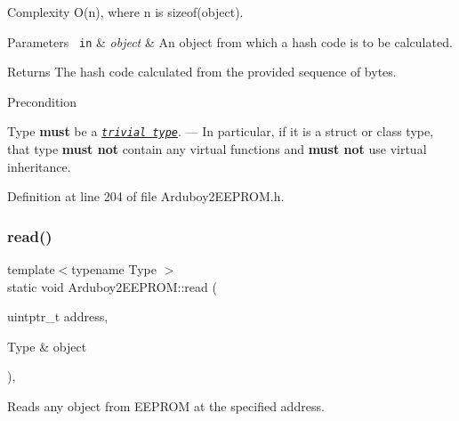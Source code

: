 \begin{DoxyParagraph}{Complexity}
{\ttfamily O(n)}, where {\ttfamily n} is {\ttfamily sizeof(object)}.
\end{DoxyParagraph}

\begin{DoxyParams}[1]{Parameters}
\mbox{\texttt{ in}}  & {\em object} & An object from which a hash code is to be calculated.\\
\hline
\end{DoxyParams}
\begin{DoxyReturn}{Returns}
The hash code calculated from the provided sequence of bytes.
\end{DoxyReturn}
\begin{DoxyPrecond}{Precondition}
\begin{DoxyItemize}
\item {\ttfamily Type} {\bfseries{must}} be a \href{https://en.cppreference.com/w/cpp/named_req/TrivialType}{\texttt{ {\itshape trivial type}}}. --- In particular, if it is a {\ttfamily struct} or {\ttfamily class} type, that type {\bfseries{must not}} contain any {\ttfamily virtual} functions and {\bfseries{must not}} use {\ttfamily virtual} inheritance. \end{DoxyItemize}

\end{DoxyPrecond}


Definition at line 204 of file Arduboy2\+E\+E\+P\+R\+O\+M.\+h.

\mbox{\label{classArduboy2EEPROM_a6e9b09f0b94295c040204ca0cb674649}} 
\subsubsection{\texorpdfstring{read()}{read()}}
{\footnotesize\ttfamily template$<$typename Type $>$ \\
static void Arduboy2\+E\+E\+P\+R\+O\+M\+::read (\begin{DoxyParamCaption}\item[{uintptr\+\_\+t}]{address,  }\item[{Type \&}]{object }\end{DoxyParamCaption})\hspace{0.3cm}{\ttfamily [inline]}, {\ttfamily [static]}}



Reads any object from E\+E\+P\+R\+OM at the specified address. 

